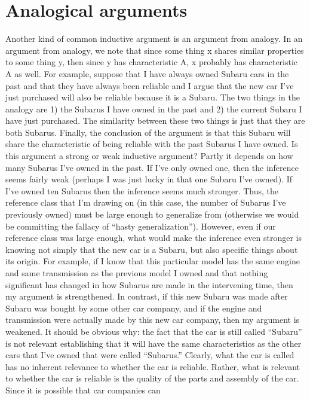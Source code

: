 \chapter{Analogical arguments}
Another kind of common inductive argument is an argument from analogy. In
an argument from analogy, we note that since some thing x shares similar
properties to some thing y, then since y has characteristic A, x probably has
characteristic A as well. For example, suppose that I have always owned Subaru
cars in the past and that they have always been reliable and I argue that the new
car I've just purchased will also be reliable because it is a Subaru. The two
things in the analogy are 1) the Subarus I have owned in the past and 2) the
current Subaru I have just purchased. The similarity between these two things is
just that they are both Subarus. Finally, the conclusion of the argument is that
this Subaru will share the characteristic of being reliable with the past Subarus I
have owned. Is this argument a strong or weak inductive argument? Partly it
depends on how many Subarus I've owned in the past. If I've only owned one,
then the inference seems fairly weak (perhaps I was just lucky in that one Subaru
I've owned). If I've owned ten Subarus then the inference seems much stronger.
Thus, the reference class that I'm drawing on (in this case, the number of
Subarus I've previously owned) must be large enough to generalize from
(otherwise we would be committing the fallacy of ``hasty generalization'').
However, even if our reference class was large enough, what would make the
inference even stronger is knowing not simply that the new car is a Subaru, but
also specific things about its origin. For example, if I know that this particular
model has the same engine and same transmission as the previous model I
owned and that nothing significant has changed in how Subarus are made in the
intervening time, then my argument is strengthened. In contrast, if this new
Subaru was made after Subaru was bought by some other car company, and if
the engine and transmission were actually made by this new car company, then
my argument is weakened. It should be obvious why: the fact that the car is still
called ``Subaru'' is not relevant establishing that it will have the same
characteristics as the other cars that I've owned that were called ``Subarus.''
Clearly, what the car is called has no inherent relevance to whether the car is
reliable. Rather, what is relevant to whether the car is reliable is the quality of
the parts and assembly of the car. Since it is possible that car companies can
